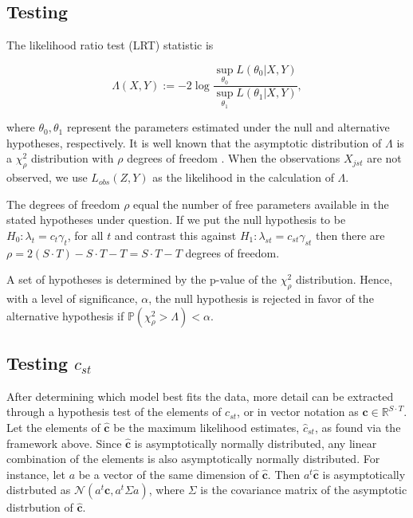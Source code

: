 \subsection{Testing}

The likelihood ratio test (LRT) statistic is

\begin{equation*}
  \label{eq:LRT}
    \Lambda(X,Y) := -2 \log{ \frac{ \sup_{\theta_0} L(\theta_0|X,Y)}{ \sup_{\theta_1} L(\theta_1|X,Y)} },
\end{equation*}

\noindent where $\theta_0, \theta_1$ represent the parameters estimated under the null and alternative hypotheses, respectively.  It is well known that the asymptotic distribution of $\Lambda$ is a $\chi_{\rho}^2$ distribution with $\rho$ degrees of freedom \citep{Wilks:1938}.  When the observations $X_{jst}$ are not observed, we use $L_{obs}(Z,Y)$ as the likelihood in the calculation of $\Lambda$.  

The degrees of freedom $\rho$ equal the number of free parameters available in the stated hypotheses under question.  If we put the null hypothesis to be $H_0: \lambda_t = c_t \gamma_t$, for all $t$ and contrast this against $H_1: \lambda_{st} = c_{st}\gamma_{st}$ then there are $\rho = 2(S \cdot T) - S \cdot T - T = S \cdot T - T$ degrees of freedom.

A set of hypotheses is determined by the p-value of the $\chi^2_{\rho}$ distribution.  Hence, with a level of significance, $\alpha$, the null hypothesis is rejected in favor of the alternative hypothesis if $\mathbb{P}(\chi^2_{\rho} > \Lambda) < \alpha$.  

\subsection{Testing $c_{st}$}

After determining which model best fits the data, more detail can be extracted through a hypothesis test of the elements of $c_{st}$, or in vector notation as $\mathbf{c} \in \mathbb{R}^{S\cdot T}$.  Let the elements of $\hat{\mathbf{c}}$ be the maximum likelihood estimates, $\hat{c}_{st}$, as found via the framework above.  Since $\hat{\mathbf{c}}$ is asymptotically normally distributed, any linear combination of the elements is also asymptotically normally distributed.  For instance, let $a$ be a vector of the same dimension of $\hat{\mathbf{c}}$.  Then $a^t\hat{\mathbf{c}}$ is asymptotically distrbuted as $\mathcal{N}(a^t\mathbf{c}, a^t\Sigma a)$, where $\Sigma$ is the covariance matrix of the asymptotic distrbution of $\hat{\mathbf{c}}$.  


